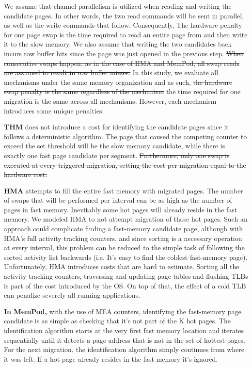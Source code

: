 We assume that channel parallelism is utilized when reading and writing the candidate pages. In other words, the two read commands will be sent in parallel, as well as the write commands that follow. Consequently, The hardware penalty for one page swap is the time required to read an entire page from and then write it to the slow memory. We also assume that writing the two candidates back incurs row buffer hits since the page was just opened in the previous step. \sout{When consecutive swaps happen, as in the case of HMA and MemPod, all swap reads are assumed to result in row buffer misses.} In this study, we evaluate all mechanisms under the same memory organization and as such, \sout{the hardware swap penalty is the same regardless of the mechanism} the time required for one migration is the same across all mechanisms. However, each mechanism introduces some unique penalties:

	\textbf{THM} does not introduce a cost for identifying the candidate pages since it follows a deterministic algorithm. The page that caused the competing counter to exceed the set threshold will be the slow memory candidate, while there is exactly one fast page candidate per segment. \sout{Furthermore, only one swap is executed at every triggered migration, setting the cost per migration equal to the hardware cost.}
	
    \textbf{HMA } attempts to fill the entire fast memory with migrated pages. The number of swaps that will be performed per interval can be as high as the number of pages in fast memory. Inevitably some hot pages will already reside in the fast memory. We modeled HMA to not attempt migration of those hot pages. Such an approach could complicate finding a fast-memory candidate page, although with HMA's full activity tracking counters, and since sorting is a necessary operation at every interval, this problem can be reduced to the simple task of following the sorted activity list backwards (i.e. It's easy to find the coldest fast-memory page). Unfortunately, HMA introduces costs that are hard to estimate. Sorting all the activity tracking counters, traversing and updating page tables and flushing TLBs is part of the cost introduced by the OS. On top of that, the effect of a cold TLB can penalize severely all running applications.
	
    \textbf{In MemPod,} with the use of MEA counters, identifying the fast-memory page candidate is as simple as checking that it's not part of the K hot pages. The identification algorithm starts at the very first fast memory location and iterates sequentially until it detects a page address that is not in the set of hottest pages. For the next migration, the identification algorithm simply continues from where it was left. If a hot page already resides in the fast memory it's ignored.

